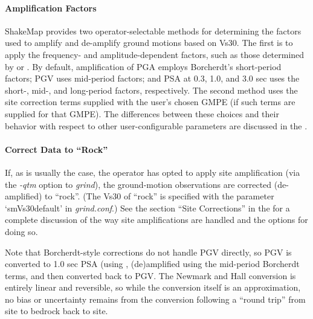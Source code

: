 \documentclass[letterpaper,10pt,english]{sphinxmanual}
\begin{document}
\paragraph{Amplification Factors}
\label{tg_processing:amplification-factors}
ShakeMap provides two operator-selectable methods for determining the factors used to
amplify and de-amplify ground motions based on Vs30. The first is to apply the
frequency- and amplitude-dependent factors, such as those determined by
{\hyperref[references:borcherdt1994]{}} or {\hyperref[references:seyhan2014]{}}.
By default, amplification of PGA employs Borcherdt's short-period factors; PGV uses mid-period
factors; and PSA at 0.3, 1.0, and 3.0 sec uses the short-, mid-, and long-period factors,
respectively. The second method uses the site correction terms supplied with the user's
chosen GMPE (if such terms are supplied for that GMPE). The differences between these
choices and their behavior with respect to other user-configurable parameters are
discussed in the {\hyperref[software_guide:software\string-guide]{}}.


\paragraph{Correct Data to ``Rock''}
\label{tg_processing:correct-data-to-rock}
If, as is usually the case, the operator has opted to apply site amplification (via the \emph{-qtm}
option to \emph{grind}), the ground-motion observations are corrected (de-amplified) to ``rock”.
(The Vs30 of ``rock'' is specified with the parameter `smVs30default' in \emph{grind.conf}.) See
the section ``Site Corrections'' in the {\hyperref[software_guide:sm35\string-software\string-guide]{}} for
a complete discussion of the way
site amplifications are handled and the options for doing so.

Note that Borcherdt-style corrections do not handle PGV directly, so PGV is converted to
1.0 sec PSA (using {\hyperref[references:newmark1982]{}}, (de)amplified using the mid-period
Borcherdt terms, and then converted back to PGV. The Newmark and Hall conversion is
entirely linear and reversible, so while the conversion itself is an approximation, no bias
or uncertainty remains from the conversion following a ``round trip'' from site to bedrock
back to site.
\end{document}
